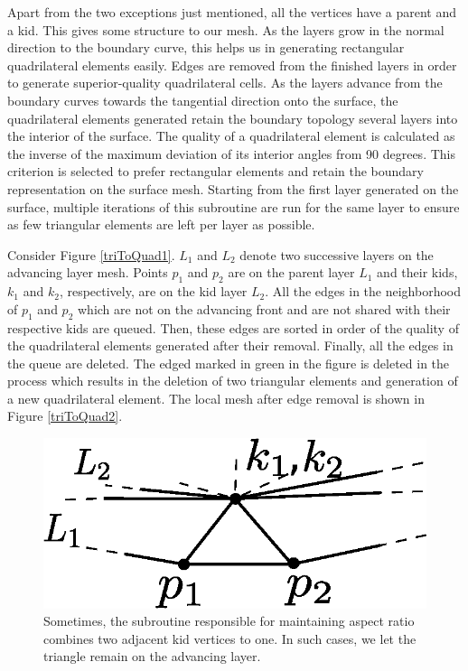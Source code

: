 Apart from the two exceptions just mentioned, all the vertices have a parent and a kid. This gives some structure to our mesh. As the layers grow in the normal direction to the boundary curve, this helps us in generating rectangular quadrilateral elements easily. Edges are removed from the finished layers in order to generate superior-quality quadrilateral cells. As the layers advance from the boundary curves towards the tangential direction onto the surface, the quadrilateral elements generated retain the boundary topology several layers into the interior of the surface. The quality of a quadrilateral element is calculated as the inverse of the maximum deviation of its interior angles from 90 degrees. This criterion is selected to prefer rectangular elements and retain the boundary representation on the surface mesh. Starting from the first layer generated on the surface, multiple iterations of this subroutine are run for the same layer to ensure as few triangular elements are left per layer as possible.

Consider Figure \ref{triToQuad1}. $L_1$ and $L_2$ denote two successive layers on the advancing layer mesh. Points $p_1$ and $p_2$ are on the parent layer $L_1$ and their kids, $k_1$ and $k_2$, respectively, are on the kid layer $L_2$. All the edges in the neighborhood of $p_1$ and $p_2$ which are not on the advancing front and are not shared with their respective kids are queued. Then, these edges are sorted in order of the quality of the quadrilateral elements generated after their removal. Finally, all the edges in the queue are deleted. The edged marked in green in the figure is deleted in the process which results in the deletion of two triangular elements and generation of a new quadrilateral element. The local mesh after edge removal is shown in Figure \ref{triToQuad2}.

\vspace{10pt}
\begin{figure}[hbt!]
	\centering
	\includegraphics[width=0.5\linewidth]{img/m2/combineTriToQuad3.eps}
	\caption[Exception in combining tris to quads]{Sometimes, the subroutine responsible for maintaining aspect ratio combines two adjacent kid vertices to one. In such cases, we let the triangle remain on the advancing layer.}
	\label{triLeft}
\end{figure}

